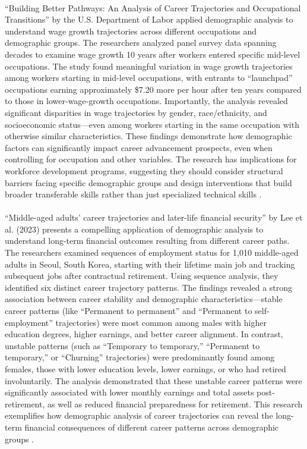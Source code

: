 \documentclass[../main.tex]{subfiles}
\begin{document}
\paragraph{} ``Building Better Pathways: An Analysis of Career Trajectories and Occupational Transitions'' by the U.S. Department of Labor applied demographic analysis to understand wage growth trajectories across different occupations and demographic groups. The researchers analyzed panel survey data spanning decades to examine wage growth 10 years after workers entered specific mid-level occupations. The study found meaningful variation in wage growth trajectories among workers starting in mid-level occupations, with entrants to ``launchpad'' occupations earning approximately \$7.20 more per hour after ten years compared to those in lower-wage-growth occupations. Importantly, the analysis revealed significant disparities in wage trajectories by gender, race/ethnicity, and socioeconomic status—even among workers starting in the same occupation with otherwise similar characteristics. These findings demonstrate how demographic factors can significantly impact career advancement prospects, even when controlling for occupation and other variables. The research has implications for workforce development programs, suggesting they should consider structural barriers facing specific demographic groups and design interventions that build broader transferable skills rather than just specialized technical skills \citep{dol2023building}.

\paragraph{} ``Middle-aged adults' career trajectories and later-life financial security'' by Lee et al. (2023) presents a compelling application of demographic analysis to understand long-term financial outcomes resulting from different career paths. The researchers examined sequences of employment status for 1,010 middle-aged adults in Seoul, South Korea, starting with their lifetime main job and tracking subsequent jobs after contractual retirement. Using sequence analysis, they identified six distinct career trajectory patterns. The findings revealed a strong association between career stability and demographic characteristics—stable career patterns (like ``Permanent to permanent'' and ``Permanent to self-employment'' trajectories) were most common among males with higher education degrees, higher earnings, and better career alignment. In contrast, unstable patterns (such as ``Temporary to temporary,'' ``Permanent to temporary,'' or ``Churning'' trajectories) were predominantly found among females, those with lower education levels, lower earnings, or who had retired involuntarily. The analysis demonstrated that these unstable career patterns were significantly associated with lower monthly earnings and total assets post-retirement, as well as reduced financial preparedness for retirement. This research exemplifies how demographic analysis of career trajectories can reveal the long-term financial consequences of different career patterns across demographic groups \citep{lee2023middle}.
\end{document}
